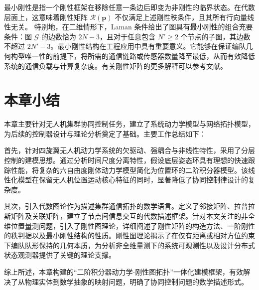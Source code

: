最小刚性是指一个刚性框架在移除任意一条边后即变为非刚性的临界状态。在代数层面上，这意味着刚性矩阵 $\mathcal{R}(\mathbf{p})$ 不仅满足上述刚性秩条件，且其所有行向量线性无关。
特别地，在二维情形下，Laman 条件给出了图具有最小刚性的组合充要条件：图 $\mathcal{G}$ 的边数恰为 $2N-3$，且对于任意包含 $N' \ge 2$ 个节点的子图，其边数不超过 $2N' - 3$。最小刚性结构在工程应用中具有重要意义。它能够在保证编队几何构型唯一性的前提下，将所需的通信链路或传感器数量降至最低，从而有效降低系统的通信负载与计算复杂度。有关刚性矩阵的更多解释可以参考文献\parencite{4653105}。

\section{本章小结}

本章主要针对无人机集群协同控制任务，建立了系统动力学模型与网络拓扑模型，为后续的控制器设计与理论分析奠定了基础。主要工作总结如下：

首先，针对四旋翼无人机动力学系统的欠驱动、强耦合与非线性特性，采用了分层控制的建模思想。通过分析时间尺度分离特性，假设底层姿态环具有理想的快速跟踪性能，将复杂的六自由度刚体动力学模型简化为位置环的二阶积分器模型。该线性化模型在保留无人机位置运动核心特征的同时，显著降低了协同控制律设计的复杂度。

其次，引入代数图论作为描述集群通信拓扑的数学语言。定义了邻接矩阵、拉普拉斯矩阵及关联矩阵，建立了节点间信息交互的代数描述框架。针对本文关注的非全维位置量测问题，引入了刚性图理论，详细阐述了刚性矩阵的构造方法、一阶刚性的秩判据以及最小刚性结构的性质。刚性图理论揭示了在仅有距离或相对方位约束下编队队形保持的几何本质，为分析非全维量测下的系统可观测性以及设计分布式状态观测器提供了关键的理论支撑。

综上所述，本章构建的“二阶积分器动力学-刚性图拓扑”一体化建模框架，有效解决了从物理实体到数学抽象的映射问题，明确了协同控制问题的数学描述形式。